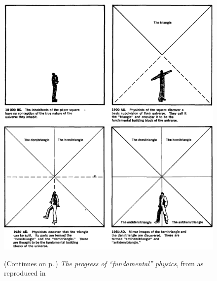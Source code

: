 \documentclass[a4paper,12pt,%
onecolumn,oneside,titlepage,%
british%
]{memoir}
\renewcommand*{\|}[1][]{\nonscript\:#1\vert\nonscript\:\mathopen{}}
\begin{document}
\begin{figure}[p]
  \centering
  \includegraphics[width=1.2\textwidth]{images/chew1.png}
  \\[1em]  \includegraphics[width=1.2\textwidth]{images/chew2.png}
  \caption{(Continues on p.\,\pageref{fig:chew2}) \emph{The progress of \enquote{fundamental} physics}, from \cites{chew1970} as reproduced in \cites{truesdell1984_r1987}}
  \label{fig:chew1}
\end{figure}
\end{document}
